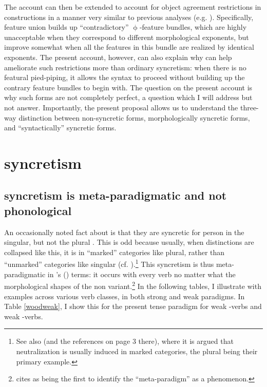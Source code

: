 \documentclass[output=paper]{langscibook}
\begin{document}
The account can then be extended to account for object agreement restrictions in \datnom constructions in a manner very similar to previous analyses (e.g. \citealt{DAlessandro:2003oy,Holmberg:2004gk,Schutze:2003mh,SigurTHsson:2008dm,Ussery:2009jd}). Specifically, feature union builds up “contradictory” $\upphi$-feature bundles, which are highly unacceptable when they correspond to different morphological exponents, but improve somewhat when all the features in this bundle are realized by identical exponents. The present account, however, can also explain why \sti can help ameliorate such restrictions more than ordinary syncretism: when there is no featural pied-piping, it allows the syntax to proceed without building up the contrary feature bundles to begin with. The question on the present account is why such forms are not completely perfect, a question which I will address but not answer. Importantly, the present proposal allows us to understand the three-way distinction between non-syncretic forms, morphologically syncretic forms, and “syntactically” syncretic forms. 


\section{\sti syncretism} 

\subsection{\sti syncretism is meta-paradigmatic and not phonological}

An occasionally noted fact about \stvs is that they are syncretic for person in the singular, but not the plural \parencites[100]{Einarsson:1949xt}[434--440]{Thomson:1987bn}[242]{Anderson:1990sm}[fn2]{Taraldsen:1995om}[270]{SigurTHsson:2008dm}. This is odd because usually, when distinctions are collapsed like this, it is in ``marked'' categories like plural, rather than ``unmarked'' categories like singular (cf. \citealt[334]{Ottosson:2008b}).\footnote{See also \citet{aalberse2010:ab} (and the references on page 3 there), where it is argued that neutralization is usually induced in marked categories, the plural being their primary example.}  This syncretism is thus meta-paradigmatic in \citeauthor{Harley:2008ul}'s (\citeyear{Harley:2008ul}) terms: it occurs with every verb no matter what the morphological shapes of the non\stin{} variant.\footnote{\citet{Harley:2008ul} cites \citet{Williams:1994zd} as being the first to identify the ``meta-paradigm'' as a phenomenon.}
 In the following tables, I illustrate with examples across various verb classes, in both strong and weak paradigms. In Table \ref{woodweak}, I show this for the present tense paradigm for weak -verbs and weak -verbs.
\end{document}

